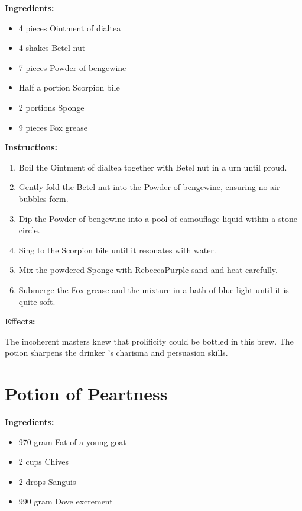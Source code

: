 \documentclass{article}
\begin{document}
\textbf{Ingredients:}

\begin{itemize}
  \item 4 pieces Ointment of dialtea
  \item 4 shakes Betel nut
  \item 7 pieces Powder of bengewine
  \item Half a portion Scorpion bile
  \item 2 portions Sponge
  \item 9 pieces Fox grease
\end{itemize}

\textbf{Instructions:}

\begin{enumerate}
  \item Boil the Ointment of dialtea together with Betel nut in a urn until proud.
  \item Gently fold the Betel nut into the Powder of bengewine, ensuring no air bubbles form.
  \item Dip the Powder of bengewine into a pool of camouflage liquid within a stone circle.
  \item Sing to the Scorpion bile until it resonates with water.
  \item Mix the powdered Sponge with RebeccaPurple sand and heat carefully.
  \item Submerge the Fox grease and the mixture in a bath of blue light until it is quite soft.
\end{enumerate}

\textbf{Effects:}

The incoherent masters knew that prolificity could be bottled in this brew. The potion sharpens the drinker 's charisma and persuasion skills.

\newpage
\section*{Potion of Peartness}

\textbf{Ingredients:}

\begin{itemize}
  \item 970 gram Fat of a young goat
  \item 2 cups Chives
  \item 2 drops Sanguis
  \item 990 gram Dove excrement
\end{itemize}
\end{document}
